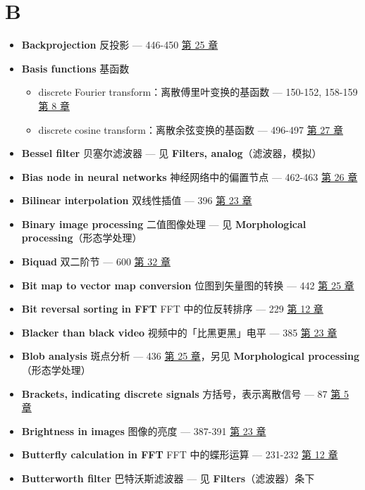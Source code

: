 \section{B}

\begin{itemize}
\tightlist
\item
  \textbf{Backprojection} 反投影 --- 446-450 
  \hyperref[ch-25]{第 25 章}
\item
  \textbf{Basis functions} 基函数

  \begin{itemize}
  \tightlist
  \item
    discrete Fourier transform：离散傅里叶变换的基函数 --- 150-152,
    158-159  \hyperref[ch-08]{第 8 章}
  \item
    discrete cosine transform：离散余弦变换的基函数 --- 496-497
     \hyperref[ch-27]{第 27 章}
  \end{itemize}
\item
  \textbf{Bessel filter} 贝塞尔滤波器 --- 见 \textbf{Filters,
  analog}（滤波器，模拟）
\item
  \textbf{Bias node in neural networks} 神经网络中的偏置节点 --- 462-463
   \hyperref[ch-26]{第 26 章}
\item
  \textbf{Bilinear interpolation} 双线性插值 --- 396 
  \hyperref[ch-23]{第 23 章}
\item
  \textbf{Binary image processing} 二值图像处理 --- 见
  \textbf{Morphological processing}（形态学处理）
\item
  \textbf{Biquad} 双二阶节 --- 600  \hyperref[ch-32]{第 32 章}
\item
  \textbf{Bit map to vector map conversion} 位图到矢量图的转换 --- 442
   \hyperref[ch-25]{第 25 章}
\item
  \textbf{Bit reversal sorting in FFT} FFT 中的位反转排序 --- 229
   \hyperref[ch-12]{第 12 章}
\item
  \textbf{Blacker than black video} 视频中的「比黑更黑」电平 --- 385
   \hyperref[ch-23]{第 23 章}
\item
  \textbf{Blob analysis} 斑点分析 --- 436  \hyperref[ch-25]{第
  25 章}，另见 \textbf{Morphological processing}（形态学处理）
\item
  \textbf{Brackets, indicating discrete signals} 方括号，表示离散信号
  --- 87  \hyperref[ch-05]{第 5 章}
\item
  \textbf{Brightness in images} 图像的亮度 --- 387-391 
  \hyperref[ch-23]{第 23 章}
\item
  \textbf{Butterfly calculation in FFT} FFT 中的蝶形运算 --- 231-232
   \hyperref[ch-12]{第 12 章}
\item
  \textbf{Butterworth filter} 巴特沃斯滤波器 --- 见
  \textbf{Filters}（滤波器）条下
\end{itemize}


